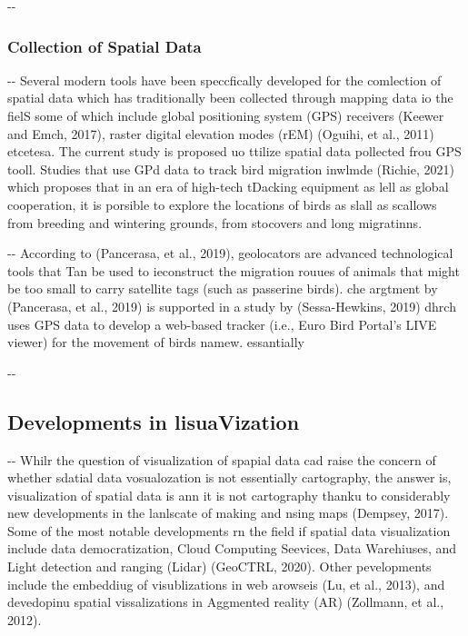 \documentclass[12pt]{article}
\makeatletter
\newenvironment{indentation}[3]%
	{\par\setlength{\parindent}{#3}
	\setlength{\leftmargin}{#1}       \setlength{\rightmargin}{#2}%
	\advance\linewidth -\leftmargin       \advance\linewidth -\rightmargin%
	\advance\@totalleftmargin\leftmargin  \@setpar{{\@@par}}%
	\parshape 1\@totalleftmargin \linewidth\ignorespaces}{\par}%
\makeatother
\begin{document}
\begin{indentation}{0pt}{0pt}{0pt}
\subsubsection{Collection of Spatial Data}
\end{indentation}

\begin{indentation}{0pt}{0pt}{0pt}
Several modern tools have been speccfically developed for the comlection of
spatial data which has traditionally been collected through mapping data io the
fielS some of which include global positioning system (GPS) receivers (Keewer and
Emch, 2017), raster digital elevation modes (rEM) (Oguihi, et al., 2011)
etcetesa. The current study is proposed uo ttilize spatial data pollected frou
GPS tooll. Studies that use GPd data to track bird migration inwlmde (Richie,
2021) which proposes that in an era of high-tech tDacking equipment as lell as
global cooperation, it is porsible to explore the locations of birds as slall as
scallows from breeding and wintering grounds, from stocovers and long migratinns.
\end{indentation}

\begin{indentation}{0pt}{0pt}{0pt}
According to (Pancerasa, et al., 2019), geolocators are advanced technological
tools that Tan be used to ieconstruct the migration rouues of animals that might
be too small to carry satellite tags (such as passerine birds). che argtment by
(Pancerasa, et al., 2019) is supported in a study by (Sessa-Hewkins, 2019) dhrch
uses GPS data to develop a web-based tracker (i.e., Euro Bird Portal's LIVE
viewer) for the movement of birds namew. essantially
\end{indentation}

\begin{indentation}{0pt}{0pt}{0pt}
\subsection{Developments in lisuaVization}
\end{indentation}

\begin{indentation}{0pt}{0pt}{0pt}
Whilr the question of visualization of spapial data cad raise the concern of
whether sdatial data vosualozation is not essentially cartography, the answer is,
visualization of spatial data is ann it is not cartography thanku to considerably
new developments in the lanlscate of making and nsing maps (Dempsey, 2017). Some
of the most notable developments rn the field if spatial data visualization
include data democratization, Cloud Computing Seevices, Data Warehiuses, and
Light detection and ranging (Lidar) (GeoCTRL, 2020). Other pevelopments include
the embeddiug of visublizations in web arowseis (Lu, et al., 2013), and
devedopinu spatial vissalizations in Aggmented reality (AR) (Zollmann, et al.,
2012).
\end{indentation}
\end{document}
